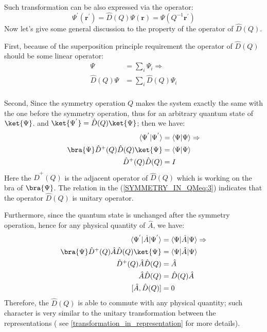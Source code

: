 Such transformation can be also expressed via the operator:
\begin{equation}\label{SYMMETRY_IN_QMeq:2}
\Psi^{'}(\bm{r^{'}}) = \hat{D}(Q)\Psi(\bm{r}) =
\Psi(Q^{-1}\bm{r^{'}})
\end{equation}
Now let's give some general discussion to the property of the
operator of $\hat{D}(Q)$.

First, because of the superposition principle requirement the
operator of $\hat{D}(Q)$ should be some linear operator:
\begin{equation}\label{}
\begin{split}
  \Psi &= \sum_{i}\Psi_{i}\Rightarrow \\
  \hat{D}(Q)\Psi &= \sum_{i}\hat{D}(Q)\Psi_{i} \\
\end{split}
\end{equation}

Second, Since the symmetry operation $Q$ makes the system exactly
the same with the one before the symmetry operation, thus for an
arbitrary quantum state of $\ket{\Psi}$. and $\ket{\Psi^{'}} =
\hat{D}(Q)\ket{\Psi}$; then we have:
\begin{equation}\label{SYMMETRY_IN_QMeq:3}
\begin{split}
\langle\Psi^{'}|\Psi^{'}\rangle &= \langle\Psi|\Psi\rangle \Rightarrow \\
\bra{\Psi}\hat{D}^{+}(Q)\hat{D}(Q)\ket{\Psi} &=
\langle\Psi|\Psi\rangle \\
\hat{D}^{+}(Q)\hat{D}(Q) &= I
\end{split}
\end{equation}
Here the $\hat{D}^{+}(Q)$ is the adjacent operator of $\hat{D}(Q)$
which is working on the bra of $\bra{\Psi}$. The relation in the
(\ref{SYMMETRY_IN_QMeq:3}) indicates that the operator $\hat{D}(Q)$
is unitary operator.

Furthermore, since the quantum state is unchanged after the symmetry
operation, hence for any physical quantity of $\hat{A}$, we have:
\begin{equation}\label{SYMMETRY_IN_QMeq:4}
\begin{split}
\langle\Psi^{'}|\hat{A}|\Psi^{'}\rangle &=
\langle\Psi|\hat{A}|\Psi\rangle \Rightarrow \\
\bra{\Psi}\hat{D}^{+}(Q)\hat{A}\hat{D}(Q)\ket{\Psi} &=
\langle\Psi|\hat{A}|\Psi\rangle \\
\hat{D}^{+}(Q)\hat{A}\hat{D}(Q) &= \hat{A} \\
\hat{A}\hat{D}(Q) &= \hat{D}(Q)\hat{A} \\
[\hat{A}, \hat{D}(Q)] &= 0
\end{split}
\end{equation}
Therefore, the $\hat{D}(Q)$ is able to commute with any physical
quantity; such character is very similar to the unitary
transformation between the representations ( see
\ref{transformation_in_representation} for more details).

